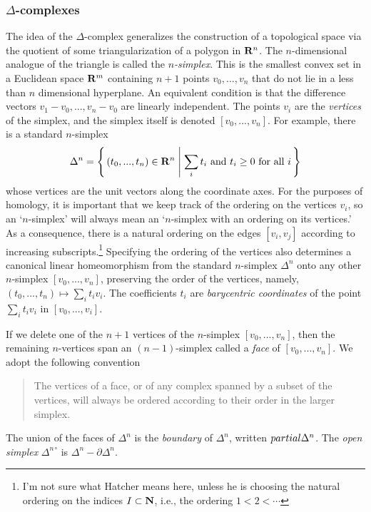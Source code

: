 \subsubsection[Delta-complexes]{$\Delta$-complexes}
The idea of the $\Delta$-complex generalizes the construction of a
topological space via the quotient of some triangularization of a polygon
in $\mathbf{R}^n$. The $n$-dimensional analogue of the triangle is called the
\emph{$n$-simplex}. This is the smallest convex set in a Euclidean space
$\mathbf{R}^m$ containing $n+1$ points $v_0,...,v_n$ that do not lie in a less
than $n$ dimensional hyperplane. An equivalent condition is that the
difference vectors $v_1-v_0,...,v_n-v_0$ are linearly independent. The
points $v_i$ are the \emph{vertices} of the simplex, and the simplex itself
is denoted $[v_0,...,v_n]$. For example, there is a standard $n$-simplex
\[
\Delta^n=\left\{\,(t_0,...,t_n)\in\mathbf{R}^n\;\middle|\;\text{$\sum_it_i$
and $t_i\geq 0$ for all $i$}\,\right\}
\]
whose vertices are the unit vectors along the coordinate axes. For the
purposes of homology, it is important that we keep track of the ordering on
the vertices $v_i$, so an `$n$-simplex' will always mean an `$n$-simplex
with an ordering on its vertices.' As a consequence, there is a natural
ordering on the edges $[v_i,v_j]$ according to increasing
subscripts.\footnote{I'm not sure what Hatcher means here, unless he is
  choosing the natural ordering on the indices $I\subset\mathbf{N}$, i.e., the
  ordering $1<2<\cdots$} Specifying the ordering of the vertices also
determines a canonical linear homeomorphism from the standard $n$-simplex
$\Delta^n$ onto any other $n$-simplex $[v_0,...,v_n]$, preserving the order
of the vertices, namely, $(t_0,...,t_n)\mapsto\sum_it_iv_i$. The
coefficients $t_i$ are \emph{barycentric coordinates} of the point
$\sum_it_iv_i$ in $[v_0,...,v_i]$.

If we delete one of the $n+1$ vertices of the $n$-simplex $[v_0,...,v_n]$,
then the remaining $n$-vertices span an $(n-1)$-simplex called a
\emph{face} of $[v_0,...,v_n]$. We adopt the following convention
\begin{quotation}
The vertices of a face, or of any complex spanned by a subset of the
vertices, will always be ordered according to their order in the larger
simplex.
\end{quotation}
The union of the faces of $\Delta^n$ is the \emph{boundary} of $\Delta^n$,
written $\\partial\Delta^n$. The \emph{open simplex}
$\left.\Delta^n\right.^\circ$ is $\Delta^n\minus\partial\Delta^n$.

